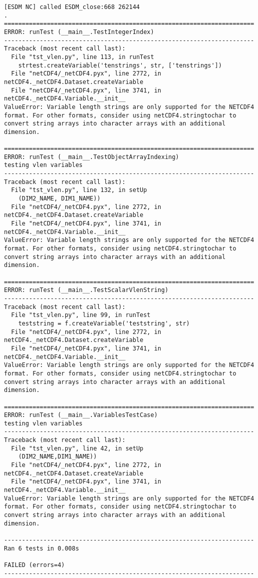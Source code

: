 \begin{verbatim}
[ESDM NC] called ESDM_close:668 262144
.
======================================================================
ERROR: runTest (__main__.TestIntegerIndex)
----------------------------------------------------------------------
Traceback (most recent call last):
  File "tst_vlen.py", line 113, in runTest
    strtest.createVariable('tenstrings', str, ['tenstrings'])
  File "netCDF4/_netCDF4.pyx", line 2772, in netCDF4._netCDF4.Dataset.createVariable
  File "netCDF4/_netCDF4.pyx", line 3741, in netCDF4._netCDF4.Variable.__init__
ValueError: Variable length strings are only supported for the NETCDF4 format. For other formats, consider using netCDF4.stringtochar to convert string arrays into character arrays with an additional dimension.

======================================================================
ERROR: runTest (__main__.TestObjectArrayIndexing)
testing vlen variables
----------------------------------------------------------------------
Traceback (most recent call last):
  File "tst_vlen.py", line 132, in setUp
    (DIM2_NAME, DIM1_NAME))
  File "netCDF4/_netCDF4.pyx", line 2772, in netCDF4._netCDF4.Dataset.createVariable
  File "netCDF4/_netCDF4.pyx", line 3741, in netCDF4._netCDF4.Variable.__init__
ValueError: Variable length strings are only supported for the NETCDF4 format. For other formats, consider using netCDF4.stringtochar to convert string arrays into character arrays with an additional dimension.

======================================================================
ERROR: runTest (__main__.TestScalarVlenString)
----------------------------------------------------------------------
Traceback (most recent call last):
  File "tst_vlen.py", line 99, in runTest
    teststring = f.createVariable('teststring', str)
  File "netCDF4/_netCDF4.pyx", line 2772, in netCDF4._netCDF4.Dataset.createVariable
  File "netCDF4/_netCDF4.pyx", line 3741, in netCDF4._netCDF4.Variable.__init__
ValueError: Variable length strings are only supported for the NETCDF4 format. For other formats, consider using netCDF4.stringtochar to convert string arrays into character arrays with an additional dimension.

======================================================================
ERROR: runTest (__main__.VariablesTestCase)
testing vlen variables
----------------------------------------------------------------------
Traceback (most recent call last):
  File "tst_vlen.py", line 42, in setUp
    (DIM2_NAME,DIM1_NAME))
  File "netCDF4/_netCDF4.pyx", line 2772, in netCDF4._netCDF4.Dataset.createVariable
  File "netCDF4/_netCDF4.pyx", line 3741, in netCDF4._netCDF4.Variable.__init__
ValueError: Variable length strings are only supported for the NETCDF4 format. For other formats, consider using netCDF4.stringtochar to convert string arrays into character arrays with an additional dimension.

----------------------------------------------------------------------
Ran 6 tests in 0.008s

FAILED (errors=4)
----------------------------------------------------------------------
\end{verbatim}
